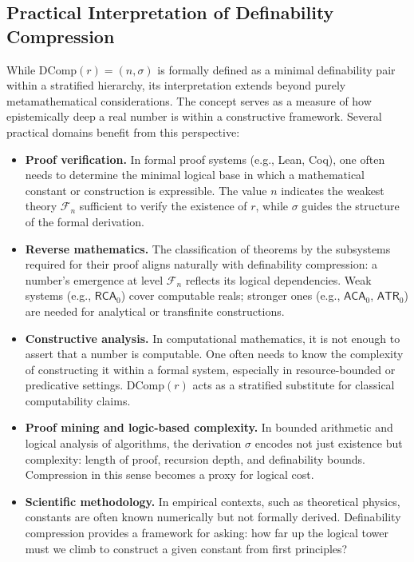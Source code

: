 \documentclass[12pt]{article}
\theoremstyle{definition}
\theoremstyle{plain}
\theoremstyle{remark}
\begin{document}
\subsection*{Practical Interpretation of Definability Compression}

While \( \mathrm{DComp}(r) = (n, \sigma) \) is formally defined as a minimal definability pair within a stratified hierarchy, its interpretation extends beyond purely metamathematical considerations. The concept serves as a measure of how epistemically deep a real number is within a constructive framework. Several practical domains benefit from this perspective:

\begin{itemize}
    \item \textbf{Proof verification.} In formal proof systems (e.g., Lean, Coq), one often needs to determine the minimal logical base in which a mathematical constant or construction is expressible. The value \( n \) indicates the weakest theory \( \mathcal{F}_n \) sufficient to verify the existence of \( r \), while \( \sigma \) guides the structure of the formal derivation.
    
    \item \textbf{Reverse mathematics.} The classification of theorems by the subsystems required for their proof aligns naturally with definability compression: a number's emergence at level \( \mathcal{F}_n \) reflects its logical dependencies. Weak systems (e.g., \( \mathsf{RCA}_0 \)) cover computable reals; stronger ones (e.g., \( \mathsf{ACA}_0 \), \( \mathsf{ATR}_0 \)) are needed for analytical or transfinite constructions.
    
    \item \textbf{Constructive analysis.} In computational mathematics, it is not enough to assert that a number is computable. One often needs to know the complexity of constructing it within a formal system, especially in resource-bounded or predicative settings. \( \mathrm{DComp}(r) \) acts as a stratified substitute for classical computability claims.
    
    \item \textbf{Proof mining and logic-based complexity.} In bounded arithmetic and logical analysis of algorithms, the derivation \( \sigma \) encodes not just existence but complexity: length of proof, recursion depth, and definability bounds. Compression in this sense becomes a proxy for logical cost.
    
    \item \textbf{Scientific methodology.} In empirical contexts, such as theoretical physics, constants are often known numerically but not formally derived. Definability compression provides a framework for asking: how far up the logical tower must we climb to construct a given constant from first principles?
\end{itemize}
\end{document}
